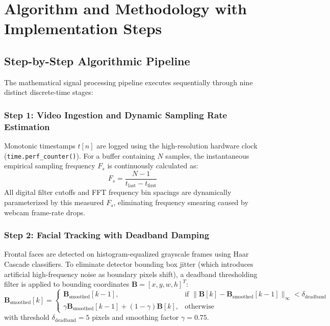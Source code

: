 \documentclass[11pt,a4paper]{report}
\begin{document}
\chapter{Algorithm and Methodology with Implementation Steps}

\section{Step-by-Step Algorithmic Pipeline}
The mathematical signal processing pipeline executes sequentially through nine distinct discrete-time stages:

\subsection{Step 1: Video Ingestion and Dynamic Sampling Rate Estimation}
Monotonic timestamps $t[n]$ are logged using the high-resolution hardware clock (\texttt{time.perf\_counter()}). For a buffer containing $N$ samples, the instantaneous empirical sampling frequency $F_s$ is continuously calculated as:
\begin{equation}
    F_s = \frac{N - 1}{t_{\text{last}} - t_{\text{first}}}
\end{equation}
All digital filter cutoffs and FFT frequency bin spacings are dynamically parameterized by this measured $F_s$, eliminating frequency smearing caused by webcam frame-rate drops.

\subsection{Step 2: Facial Tracking with Deadband Damping}
Frontal faces are detected on histogram-equalized grayscale frames using Haar Cascade classifiers. To eliminate detector bounding box jitter (which introduces artificial high-frequency noise as boundary pixels shift), a deadband thresholding filter is applied to bounding coordinates $\mathbf{B} = [x, y, w, h]^T$:
\begin{equation}
    \mathbf{B}_{\text{smoothed}}[k] = 
    \begin{cases}
        \mathbf{B}_{\text{smoothed}}[k-1], & \text{if } \|\mathbf{B}[k] - \mathbf{B}_{\text{smoothed}}[k-1]\|_\infty < \delta_{\text{deadband}} \\
        \gamma \mathbf{B}_{\text{smoothed}}[k-1] + (1 - \gamma) \mathbf{B}[k], & \text{otherwise}
    \end{cases}
\end{equation}
with threshold $\delta_{\text{deadband}} = 5\text{ pixels}$ and smoothing factor $\gamma = 0.75$.
\end{document}
